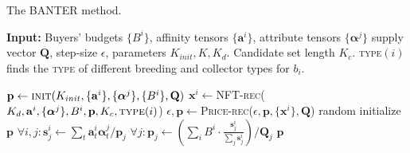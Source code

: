 \documentclass[conference]{IEEEtran}
\theoremstyle{plain}
\begin{document}
\begin{algorithm}[t]
    \small
    \caption{The BANTER\xspace method.}
    \label{alg:method}
    \textbf{Input:} Buyers' budgets $\{B^i\}$, affinity tensors $\{\mathbf{a}^i\}$, attribute tensors $\{\bm{\alpha}^j\}$ supply vector $\mathbf{Q}$, step-size $\epsilon$, parameters $K_{init}, K, K_d$. Candidate set length $K_c$. \textsc{type}$(i)$ finds the \textsc{type} of different breeding and collector types for $b_i$.
    \begin{algorithmic}[1]
    \State $\mathbf{p}\gets \textsc{init}(K_{init}, \{\mathbf{a}^i\}, \{\bm{\alpha}^j\}, \{B^i\}, \mathbf{Q})$
            \State $\mathbf{x}^i\gets$\textsc{NFT-rec}\xspace($K_{d}, \mathbf{a}^i, \{\bm{\alpha}^j\}, B^i, \mathbf{p}, K_c, \textsc{type}(i)$)
        \EndFor
        \State $\epsilon, \mathbf{p} \gets$\textsc{Price-rec}\xspace($\epsilon, \mathbf{p}, \{\mathbf{x}^i\}, \mathbf{Q}$)
    \EndFor
        \State random initialize $\mathbf{p}$
            \State $\forall i, j: \mathbf{s}^i_j \gets \sum_t\mathbf{a}^i_t\bm{\alpha}^j_t/\mathbf{p}_j$
            \State 
            $\forall j: \mathbf{p}_j\gets \left(\sum_i B^i\cdot \frac{\mathbf{s}^i_j}{\sum_j \mathbf{s}^i_j}\right)/\mathbf{Q}_j$
        \EndFor
        \Return $\mathbf{p}$
    \EndProcedure
    \end{algorithmic}
\end{algorithm}
\end{document}
